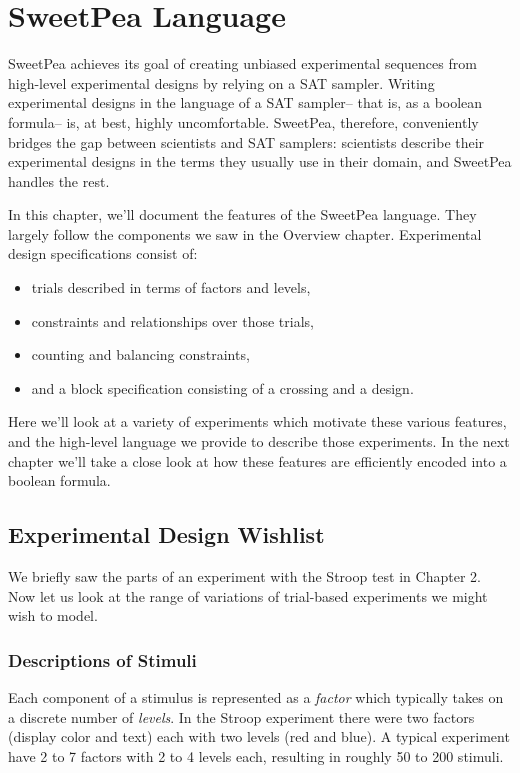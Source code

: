 
\chapter{SweetPea Language}

SweetPea achieves its goal of creating unbiased experimental sequences from high-level experimental designs by relying on a SAT sampler. Writing experimental designs in the language of a SAT sampler-- that is, as a boolean formula-- is, at best, highly uncomfortable. SweetPea, therefore, conveniently bridges the gap between scientists and SAT samplers: scientists describe their experimental designs in the terms they usually use in their domain, and SweetPea handles the rest.

In this chapter, we'll document the features of the SweetPea language. They largely follow the components we saw in the Overview chapter. Experimental design specifications consist of:
\begin{itemize}
  \item trials described in terms of factors and levels,
  \item constraints and relationships over those trials,
  \item counting and balancing constraints,
  \item and a block specification consisting of a crossing and a design.
\end{itemize}

Here we'll look at a variety of experiments which motivate these various features, and the high-level language we provide to describe those experiments. In the next chapter we'll take a close look at how these features are efficiently encoded into a boolean formula.


\section{Experimental Design Wishlist}

We briefly saw the parts of an experiment with the Stroop test in Chapter 2. Now let us look at the range of variations of trial-based experiments we might wish to model.

\subsection{Descriptions of Stimuli}

Each component of a stimulus is represented as a \emph{factor} which typically takes on a discrete number of \emph{levels}. In the Stroop experiment there were two factors (display color and text) each with two levels (red and blue). A typical experiment have 2 to 7 factors with 2 to 4 levels each, resulting in roughly 50 to 200 stimuli.

